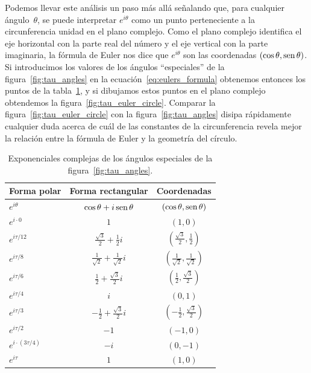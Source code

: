 Podemos llevar este análisis un paso más allá señalando que, para cualquier ángulo~$\theta$, se puede interpretar $e^{i\theta}$ como un punto perteneciente a la circunferencia unidad en el plano complejo. Como el plano complejo identifica el eje horizontal con la parte real del número y el eje vertical con la parte imaginaria, la fórmula de Euler nos dice que $e^{i\theta}$ son las coordenadas $(\cos\theta, \mbox{sen}\,\theta)$. Si introducimos los valores de los ángulos ``especiales'' de la figura~\ref{fig:tau_angles} en la ecuación~\eqref{eq:eulers_formula} obtenemos entonces los puntos de la tabla~\ref{table:complex_exponentials}, y si dibujamos estos puntos en el plano complejo obtendemos la figura~\ref{fig:tau_euler_circle}. Comparar la figura~\ref{fig:tau_euler_circle} con la figura~\ref{fig:tau_angles} disipa rápidamente cualquier duda acerca de cuál de las constantes de la circunferencia revela mejor la relación entre la fórmula de Euler y la geometría del círculo.

\begin{table}
\begin{center}
\begin{tabular}{lcc}
Forma polar & Forma rectangular & Coordenadas \\ \hline\hline
$e^{i\theta}$ & $\cos\theta + i\,\mbox{sen}\,\theta$ & $(\cos\theta, \mbox{sen}\,\theta)$ \\ \hline
$e^{i\cdot0}$ & $1$ & $(1, 0)$ \smallskip \\
$e^{i\tau/12}$ & $\frac{\sqrt{3}}{2} + \frac{1}{2}i$ & $(\frac{\sqrt{3}}{2}, \frac{1}{2})$ \smallskip \\
$e^{i\tau/8}$ & $\frac{1}{\sqrt{2}} +  \frac{1}{\sqrt{2}}i$ & $(\frac{1}{\sqrt{2}}, \frac{1}{\sqrt{2}})$ \smallskip \\
$e^{i\tau/6}$ & $\frac{1}{2} +\frac{\sqrt{3}}{2} i$ & $(\frac{1}{2}, \frac{\sqrt{3}}{2})$ \smallskip \\
$e^{i\tau/4}$ & $i$ & $(0, 1)$ \smallskip \\
$e^{i\tau/3}$ & $-\frac{1}{2} +\frac{\sqrt{3}}{2} i$ & $(-\frac{1}{2}, \frac{\sqrt{3}}{2})$ \smallskip \\
$e^{i\tau/2}$ & $-1$ & $(-1, 0)$ \smallskip \\
$e^{i\cdot(3\tau/4)}$ & $-i$ & $(0, -1)$ \smallskip \\
$e^{i\tau}$ & $1$ & $(1, 0)$
\end{tabular}
\end{center}
\caption{Exponenciales complejas de los ángulos especiales de la figura~\ref{fig:tau_angles}.\label{table:complex_exponentials}}
\end{table}

